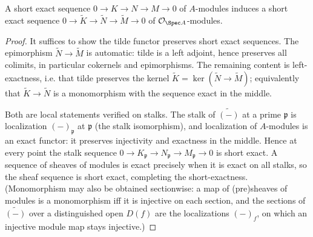 \begin{lemma}
  \label{lem:tilde_exact}
  A short exact sequence $0 \to K \to N \to M \to 0$ of $A$-modules induces a
  short exact sequence
  $0 \to \widetilde K \to \widetilde N \to \widetilde M \to 0$ of
  $\mathcal{O}_{\Spec A}$-modules.
  \begin{proof}\leanok
    It suffices to show the tilde functor preserves short exact sequences. The
    epimorphism $\widetilde N \to \widetilde M$ is automatic: tilde is a left
    adjoint, hence preserves all colimits, in particular cokernels and
    epimorphisms. The remaining content is left-exactness, i.e. that tilde
    preserves the kernel $\widetilde K = \ker(\widetilde N \to \widetilde M)$;
    equivalently that $\widetilde K \to \widetilde N$ is a monomorphism with the
    sequence exact in the middle.

    Both are local statements verified on stalks. The stalk of $\widetilde{(-)}$
    at a prime $\mathfrak p$ is localization $(-)_{\mathfrak p}$ at
    $\mathfrak p$ (the stalk isomorphism), and localization of $A$-modules is an
    exact functor: it preserves injectivity and exactness in the middle. Hence at
    every point the stalk sequence
    $0 \to K_{\mathfrak p} \to N_{\mathfrak p} \to M_{\mathfrak p} \to 0$ is
    short exact. A sequence of sheaves of modules is exact precisely when it is
    exact on all stalks, so the sheaf sequence is short exact, completing the
    short-exactness. (Monomorphism may also be obtained sectionwise: a map of
    (pre)sheaves of modules is a monomorphism iff it is injective on each
    section, and the sections of $\widetilde{(-)}$ over a distinguished open
    $D(f)$ are the localizations $(-)_f$, on which an injective module map stays
    injective.)
  \end{proof}
\end{lemma}


